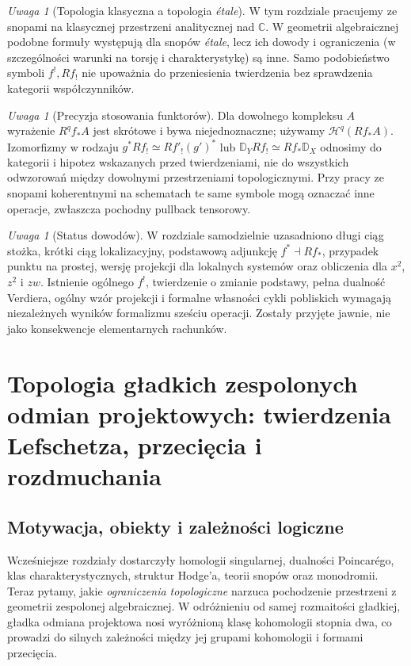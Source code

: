 \documentclass[11pt,a4paper,oneside]{report}
\newcommand{\C}{\mathbb{C}}
\theoremstyle{plain}
\theoremstyle{definition}
\theoremstyle{remark}
\newtheorem{uwaga}[twierdzenie]{Uwaga}
\begin{document}
\begin{uwaga}[Topologia klasyczna a topologia \emph{étale}]
W tym rozdziale pracujemy ze snopami na klasycznej przestrzeni
analitycznej nad $\C$. W geometrii algebraicznej podobne formuły
występują dla snopów \emph{étale}, lecz ich dowody i ograniczenia
(w szczególności warunki na torsję i charakterystykę) są inne.
Samo podobieństwo symboli $f^!,Rf_!$ nie upoważnia do
przeniesienia twierdzenia bez sprawdzenia kategorii współczynników.
\end{uwaga}
\begin{uwaga}[Precyzja stosowania funktorów]
Dla dowolnego kompleksu $A$ wyrażenie $R^qf_*A$ jest
skrótowe i bywa niejednoznaczne; używamy
$\mathcal H^q(Rf_*A)$. Izomorfizmy w rodzaju
$g^*Rf_!\simeq Rf'_!(g')^*$ lub
$\mathbb D_YRf_!\simeq Rf_*\mathbb D_X$ odnosimy do
kategorii i hipotez wskazanych przed twierdzeniami,
nie do wszystkich odwzorowań między dowolnymi
przestrzeniami topologicznymi. Przy pracy ze snopami
koherentnymi na schematach te same symbole mogą oznaczać
inne operacje, zwłaszcza pochodny pullback tensorowy.
\end{uwaga}
\begin{uwaga}[Status dowodów]
W rozdziale samodzielnie uzasadniono długi ciąg stożka,
krótki ciąg lokalizacyjny, podstawową adjunkcję $f^*\dashv Rf_*$,
przypadek punktu na prostej, wersję projekcji dla
lokalnych systemów oraz obliczenia dla $x^2$, $z^2$ i $zw$.
Istnienie ogólnego $f^!$, twierdzenie o zmianie podstawy,
pełna dualność Verdiera, ogólny wzór projekcji i formalne
własności cykli pobliskich wymagają niezależnych wyników
formalizmu sześciu operacji. Zostały przyjęte jawnie,
nie jako konsekwencje elementarnych rachunków.
\end{uwaga}

\chapter{Topologia gładkich zespolonych odmian projektowych: twierdzenia Lefschetza, przecięcia i rozdmuchania}
\label{ch:xvii-topologia-odmian}

\section{Motywacja, obiekty i zależności logiczne}
Wcześniejsze rozdziały dostarczyły homologii singularnej, dualności
Poincarégo, klas charakterystycznych, struktur Hodge'a, teorii snopów
oraz monodromii. Teraz pytamy, jakie \emph{ograniczenia topologiczne}
narzuca pochodzenie przestrzeni z geometrii zespolonej algebraicznej.
W odróżnieniu od samej rozmaitości gładkiej, gładka odmiana projektowa
nosi wyróżnioną klasę kohomologii stopnia dwa, co prowadzi do
silnych zależności między jej grupami kohomologii i formami przecięcia.
\end{document}
